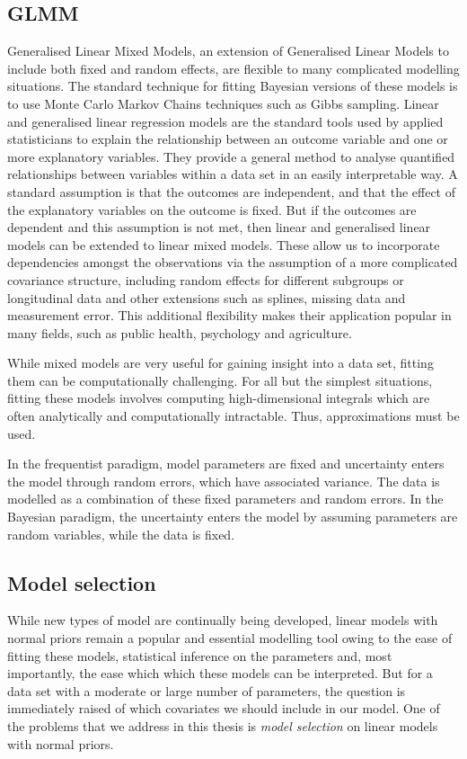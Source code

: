 \subsection{GLMM}

Generalised Linear Mixed Models, an extension of Generalised Linear Models to include both fixed and
random effects, are flexible to many complicated modelling situations. The standard technique for fitting
Bayesian versions of these models is to use Monte Carlo Markov Chains techniques such as Gibbs sampling.
Linear and generalised linear regression models are the standard tools used by applied statisticians to
explain the relationship between an outcome variable and one or more explanatory variables. They provide a
general method  to analyse quantified relationships between variables within a data set in an easily
interpretable way. A standard assumption is that the outcomes are independent, and that the effect of the
explanatory variables on the outcome is fixed. But if the outcomes are dependent and this assumption is not
met, then linear and generalised linear models can be extended to linear mixed models. These allow us to
incorporate dependencies amongst the  observations via the assumption of a more complicated covariance
structure, including random effects for  different subgroups or longitudinal data and other extensions such as
splines, missing data and measurement error. This additional flexibility makes their application popular in
many fields, such as public health, psychology and agriculture.

While mixed models are very useful for gaining insight into a data set, fitting them can be computationally
challenging. For all but the simplest situations, fitting these models involves computing high-dimensional
integrals which are often analytically and computationally intractable. Thus, approximations must be used.

In the frequentist paradigm, model parameters are fixed and uncertainty enters the model through random
errors, which have associated variance. The data is modelled as a combination of these fixed parameters and
random errors. In the Bayesian paradigm, the uncertainty enters the model by assuming parameters are random
variables, while the data is fixed.

\subsection{Model selection}

While new types of model are continually being developed, linear models with normal priors remain a popular
and essential modelling tool owing to the ease of fitting these models, statistical inference on the
parameters and, most importantly, the ease which which these models can be interpreted. But for a data set
with a moderate or large number of parameters, the question is immediately raised of which covariates we should
include in our model. One of the problems that we address in this thesis is \emph{model selection} on linear
models with normal priors.

